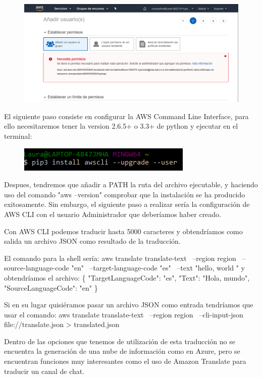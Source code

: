 \documentclass[runningheads]{llncs}
\begin{document}
	\begin{figure}[H]
		\centering
		\includegraphics[scale=0.5]{./IA/AWS/denyedpermissionAWS.png}
	\end{figure}
	
	El siguiente paso consiste en configurar la AWS Command Line Interface, para  ello necesitaremos tener la version 2.6.5+ o 3.3+ de python y ejecutar en el terminal:
	
	\begin{figure}[H]
		\centering
		\includegraphics[scale=0.5]{./IA/AWS/pipAWS.png}
	\end{figure}
	
	Despues, tendremos que añadir a PATH la ruta del archivo ejecutable, y haciendo uso del comando "aws --version" comprobar que la instalación se ha producido exitosamente. Sin embargo, el siguiente paso a realizar sería la configuración de AWS CLI con el usuario Administrador que deberíamos haber creado.
	
	Con AWS CLI podemos traducir hasta 5000 caracteres y obtendríamos como salida un archivo JSON como resultado de la traducción.
	
	El comando para la shell sería:
	aws translate translate-text \
	--region region \
	--source-language-code "en" \
	--target-language-code "es" \
	--text "hello, world " 
	y obtendríamos el archivo:
	\{
	"TargetLanguageCode": "es",
	"Text": "Hola, mundo",
	"SourceLanguageCode": "en"
	\}
	
	Si en su lugar quisiéramos pasar un archivo JSON como entrada tendríamos que usar el comando:
	aws translate translate-text \
	--region region \
	--cli-input-json file://translate.json > translated.json
	
	Dentro de las opciones que tenemos de utilización de esta traducción no se encuentra la generación de una nube de información como en Azure, pero se encuentran funciones muy interesantes como el uso de Amazon Translate para traducir un canal de chat.
	
\end{document}
